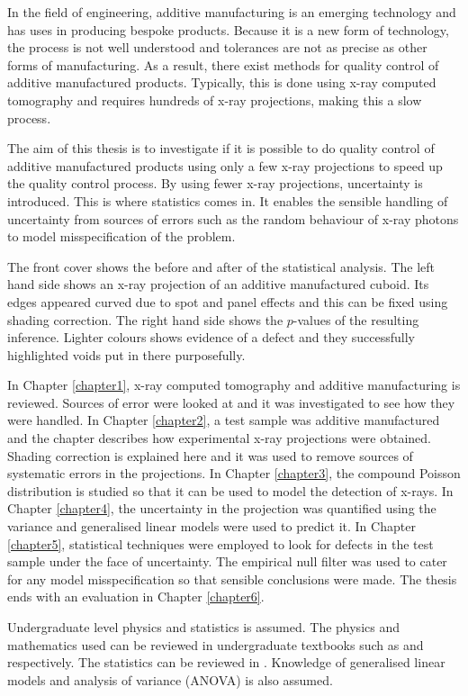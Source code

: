 \documentclass[12pt, a4paper]{memoir}
\begin{document}
In the field of engineering, additive manufacturing is an emerging technology and has uses in producing bespoke products. Because it is a new form of technology, the process is not well understood and tolerances are not as precise as other forms of manufacturing. As a result, there exist methods for quality control of additive manufactured products. Typically, this is done using x-ray computed tomography and requires hundreds of x-ray projections, making this a slow process.

The aim of this thesis is to investigate if it is possible to do quality control of additive manufactured products using only a few x-ray projections to speed up the quality control process. By using fewer x-ray projections, uncertainty is introduced. This is where statistics comes in. It enables the sensible handling of uncertainty from sources of errors such as the random behaviour of x-ray photons to model misspecification of the problem.

The front cover shows the before and after of the statistical analysis. The left hand side shows an x-ray projection of an additive manufactured cuboid. Its edges appeared curved due to spot and panel effects and this can be fixed using shading correction. The right hand side shows the $p$-values of the resulting inference. Lighter colours shows evidence of a defect and they successfully highlighted voids put in there purposefully.

In Chapter \ref{chapter1}, x-ray computed tomography and additive manufacturing is reviewed. Sources of error were looked at and it was investigated to see how they were handled. In Chapter \ref{chapter2}, a test sample was additive manufactured and the chapter describes how experimental x-ray projections were obtained. Shading correction is explained here and it was used to remove sources of systematic errors in the projections. In Chapter \ref{chapter3}, the compound Poisson distribution is studied so that it can be used to model the detection of x-rays. In Chapter \ref{chapter4}, the uncertainty in the projection was quantified using the variance and generalised linear models were used to predict it. In Chapter \ref{chapter5}, statistical techniques were employed to look for defects in the test sample under the face of uncertainty. The empirical null filter was used to cater for any model misspecification so that sensible conclusions were made. The thesis ends with an evaluation in Chapter \ref{chapter6}.

Undergraduate level physics and statistics is assumed. The physics and mathematics used can be reviewed in undergraduate textbooks such as \cite{serway2018physics} and \cite{riley2006mathematical} respectively. The statistics can be reviewed in \cite{rice2009mathematical}. Knowledge of generalised linear models \citep{nelder1972generalized,nelder1972generalized_2, mccullagh1984generalized} and analysis of variance (ANOVA) is also assumed.
\end{document}
